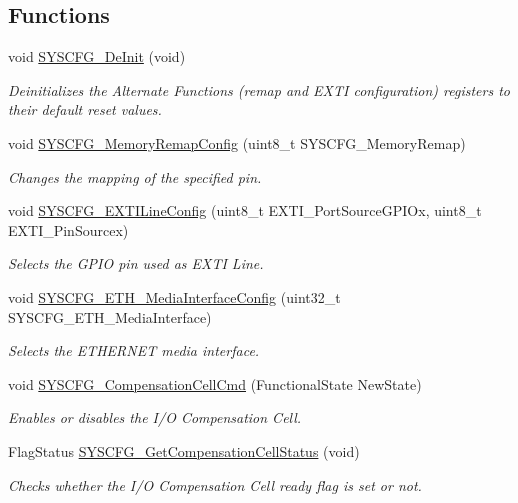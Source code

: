 \subsection*{Functions}
\begin{DoxyCompactItemize}
\item 
void \hyperlink{group___s_y_s_c_f_g_gaf2f9faa2df9a59a68ae17fae23bc478e}{S\-Y\-S\-C\-F\-G\-\_\-\-De\-Init} (void)
\begin{DoxyCompactList}\small\item\em Deinitializes the Alternate Functions (remap and E\-X\-T\-I configuration) registers to their default reset values. \end{DoxyCompactList}\item 
void \hyperlink{group___s_y_s_c_f_g_ga09a5712f6c66ba5f0e0eeba30bc1e20d}{S\-Y\-S\-C\-F\-G\-\_\-\-Memory\-Remap\-Config} (uint8\-\_\-t S\-Y\-S\-C\-F\-G\-\_\-\-Memory\-Remap)
\begin{DoxyCompactList}\small\item\em Changes the mapping of the specified pin. \end{DoxyCompactList}\item 
void \hyperlink{group___s_y_s_c_f_g_gafedab1f64cef720aeafeafd409ba6ae7}{S\-Y\-S\-C\-F\-G\-\_\-\-E\-X\-T\-I\-Line\-Config} (uint8\-\_\-t E\-X\-T\-I\-\_\-\-Port\-Source\-G\-P\-I\-Ox, uint8\-\_\-t E\-X\-T\-I\-\_\-\-Pin\-Sourcex)
\begin{DoxyCompactList}\small\item\em Selects the G\-P\-I\-O pin used as E\-X\-T\-I Line. \end{DoxyCompactList}\item 
void \hyperlink{group___s_y_s_c_f_g_gabec494266ebbbde0279ad1d16c3065d0}{S\-Y\-S\-C\-F\-G\-\_\-\-E\-T\-H\-\_\-\-Media\-Interface\-Config} (uint32\-\_\-t S\-Y\-S\-C\-F\-G\-\_\-\-E\-T\-H\-\_\-\-Media\-Interface)
\begin{DoxyCompactList}\small\item\em Selects the E\-T\-H\-E\-R\-N\-E\-T media interface. \end{DoxyCompactList}\item 
void \hyperlink{group___s_y_s_c_f_g_ga85e423de2ee76b615120bde37881bb93}{S\-Y\-S\-C\-F\-G\-\_\-\-Compensation\-Cell\-Cmd} (Functional\-State New\-State)
\begin{DoxyCompactList}\small\item\em Enables or disables the I/\-O Compensation Cell. \end{DoxyCompactList}\item 
Flag\-Status \hyperlink{group___s_y_s_c_f_g_ga2541640bdf35f63e4bb55f7dc8be9d16}{S\-Y\-S\-C\-F\-G\-\_\-\-Get\-Compensation\-Cell\-Status} (void)
\begin{DoxyCompactList}\small\item\em Checks whether the I/\-O Compensation Cell ready flag is set or not. \end{DoxyCompactList}\end{DoxyCompactItemize}


